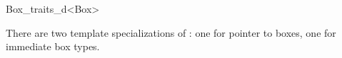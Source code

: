 
\ccRefPageBegin
\begin{ccRefClass}{Box_traits_d<Box>}

\ccDefinition
There are two template specializations of : one for pointer to boxes, one for immediate box types.


\ccIsModel
{}







\end{ccRefClass}


\ccRefPageEnd
